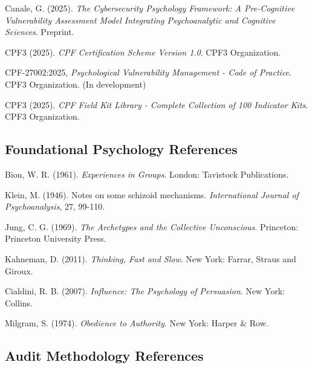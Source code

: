 \documentclass[11pt,a4paper]{article}
\begin{document}
\begin{thebibliography}{99}

Canale, G. (2025). \textit{The Cybersecurity Psychology Framework: A Pre-Cognitive Vulnerability Assessment Model Integrating Psychoanalytic and Cognitive Sciences}. Preprint.

CPF3 (2025). \textit{CPF Certification Scheme Version 1.0}. CPF3 Organization.

CPF-27002:2025, \textit{Psychological Vulnerability Management - Code of Practice}. CPF3 Organization. (In development)

CPF3 (2025). \textit{CPF Field Kit Library - Complete Collection of 100 Indicator Kits}. CPF3 Organization.

\end{thebibliography}

\subsection{Foundational Psychology References}

\begin{thebibliography}{99}

Bion, W. R. (1961). \textit{Experiences in Groups}. London: Tavistock Publications.

Klein, M. (1946). Notes on some schizoid mechanisms. \textit{International Journal of Psychoanalysis}, 27, 99-110.

Jung, C. G. (1969). \textit{The Archetypes and the Collective Unconscious}. Princeton: Princeton University Press.

Kahneman, D. (2011). \textit{Thinking, Fast and Slow}. New York: Farrar, Straus and Giroux.

Cialdini, R. B. (2007). \textit{Influence: The Psychology of Persuasion}. New York: Collins.

Milgram, S. (1974). \textit{Obedience to Authority}. New York: Harper \& Row.

\end{thebibliography}

\subsection{Audit Methodology References}
\end{document}
